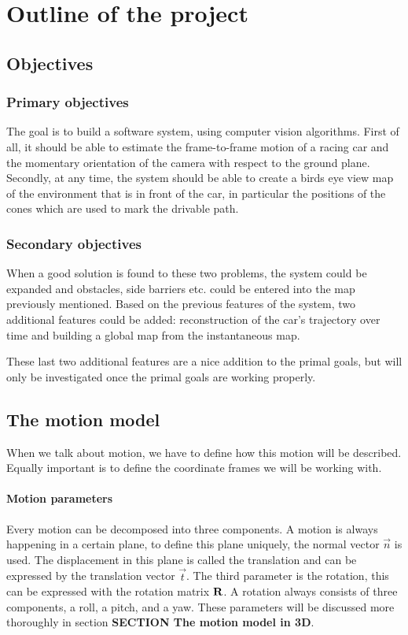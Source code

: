 \chapter{Outline of the project}
\label{chap:outline}

\section{Objectives}
\subsection{Primary objectives}
The goal is to build a software system, using computer vision algorithms. First of all, it should be able to estimate the frame-to-frame motion of a racing car and the momentary orientation of the camera with respect to the ground plane. Secondly, at any time, the system should be able to create a birds eye view map of the environment that is in front of the car, in particular the positions of the cones which are used to mark the drivable path.\bigskip 

\subsection{Secondary objectives}
When a good solution is found to these two problems, the system could be expanded and obstacles, side barriers etc. could be entered into the map previously mentioned. Based on the previous features of the system, two additional features could be added: reconstruction of the car's trajectory over time and building a global map from the instantaneous map.\bigskip

These last two additional features are a nice addition to the primal goals, but will only be investigated once the primal goals are working properly.\bigskip

\section{The motion model}
When we talk about motion, we have to define how this motion will be described. Equally important is to define the coordinate frames we will be working with.

\subsubsection{Motion parameters}
Every motion can be decomposed into three components. A motion is always happening in a certain plane, to define this plane uniquely, the normal vector $\vec{n}$ is used. The displacement in this plane is called the translation and can be expressed by the translation vector $\vec{t}$. The third parameter is the rotation, this can be expressed with the rotation matrix $\mathbf{R}$. A rotation always consists of three components, a roll, a pitch, and a yaw. These parameters will be discussed more thoroughly in section \textbf{SECTION The motion model in 3D}.

